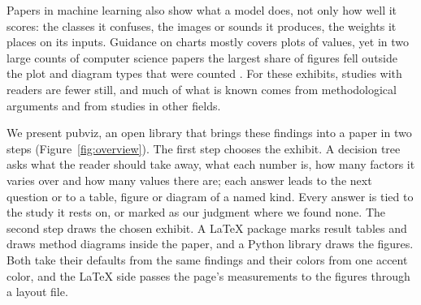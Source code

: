 \documentclass[11pt]{article}
\begin{document}
Papers in machine learning also show what a model does, not only how well it
scores: the classes it confuses, the images or sounds it produces, the
weights it places on its inputs. Guidance on charts mostly covers plots of
values, yet in two large counts of computer science papers the largest share
of figures fell outside the plot and diagram types that were counted
\citep[Table~1]{siegel2016figureseer}\citep[Sec.~3]{hsu2021scicap}. For these
exhibits, studies with readers are fewer still, and much of what is known
comes from methodological arguments and from studies in other fields.

We present pubviz, an open library that brings these findings into a paper
in two steps (Figure~\ref{fig:overview}). The first step chooses the exhibit.
A decision tree asks what the reader should take away, what each number is,
how many factors it varies over and how many values there are; each answer
leads to the next question or to a table, figure or diagram of a named kind.
Every answer is tied to the study it rests on, or marked as our judgment
where we found none. The second step draws the chosen exhibit. A LaTeX
package marks result tables and draws method diagrams inside the paper, and
a Python library draws the figures. Both take their defaults from the same
findings and their colors from one accent color, and the LaTeX side passes
the page's measurements to the figures through a layout file.
\end{document}
